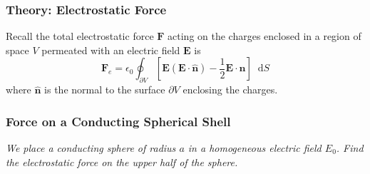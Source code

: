 \documentclass[11pt, a4paper]{article}
\newcommand{\diff}{\mathop{}\!\mathrm{d}} %
\renewcommand{\vec}[1]{\bm{#1}} %
\newcommand{\uvec}[1]{\hat{\vec{#1}}} %
\newcommand{\E}{\vec{E}} %
\newcommand{\e}{\epsilon_{0}} %
\begin{document}
\subsubsection{Theory: Electrostatic Force}
Recall the total electrostatic force $ \vec{F} $ acting on the charges enclosed in a region of space $ V $ permeated with an electric field $ \E $ is
\begin{equation*}
	\vec{F}_{e} = \e \oint_{\partial V}\left[\E(\E\cdot \uvec{n}) - \frac{1}{2}\E\cdot \vec{n}\right] \diff S
\end{equation*}
where $ \uvec{n} $ is the normal to the surface $ \partial V $ enclosing the charges.


\subsubsection{Force on a Conducting Spherical Shell}
\textit{We place a conducting sphere of radius $ a $ in a homogeneous electric field $ E_{0} $. Find the electrostatic force on the upper half of the sphere.}
\end{document}
